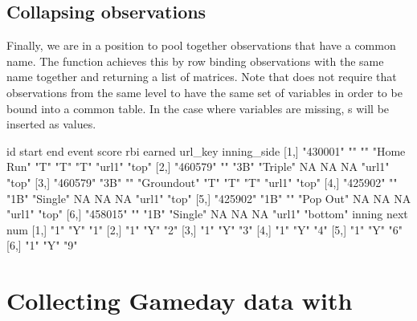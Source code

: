\begin{article}
\subsection{Collapsing observations}

Finally, we are in a position to pool together observations that have
a common name. The  function achieves this by
row binding observations with the same name together and returning
a list of matrices. Note that  does not require
that observations from the same level to have the same set of variables
in order to be bound into a common table. In the case where variables
are missing, s will be inserted as values.
%
\begin{Schunk}
\begin{Soutput}
     id       start end  event       score rbi earned url_key inning_side
[1,] "430001" ""    ""   "Home Run"  "T"   "T" "T"    "url1"  "top"      
[2,] "460579" ""    "3B" "Triple"    NA    NA  NA     "url1"  "top"      
[3,] "460579" "3B"  ""   "Groundout" "T"   "T" "T"    "url1"  "top"      
[4,] "425902" ""    "1B" "Single"    NA    NA  NA     "url1"  "top"      
[5,] "425902" "1B"  ""   "Pop Out"   NA    NA  NA     "url1"  "top"      
[6,] "458015" ""    "1B" "Single"    NA    NA  NA     "url1"  "bottom"   
     inning next num
[1,] "1"    "Y"  "1"
[2,] "1"    "Y"  "2"
[3,] "1"    "Y"  "3"
[4,] "1"    "Y"  "4"
[5,] "1"    "Y"  "6"
[6,] "1"    "Y"  "9"
\end{Soutput}
\end{Schunk}
%

\section[Collecting Gameday data with pitchRx]{Collecting Gameday data with }


\end{article}
